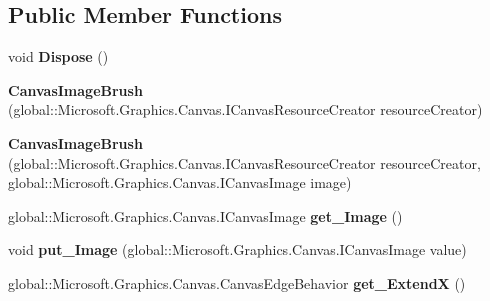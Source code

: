 \subsection*{Public Member Functions}
\begin{DoxyCompactItemize}
\item 
\mbox{\label{class_microsoft_1_1_graphics_1_1_canvas_1_1_brushes_1_1_canvas_image_brush_a287a8959ebff5767a97c27bfd52ec3b7}} 
void {\bfseries Dispose} ()
\item 
\mbox{\label{class_microsoft_1_1_graphics_1_1_canvas_1_1_brushes_1_1_canvas_image_brush_adbb56b8d19fbd4dfd899d515aba49f92}} 
{\bfseries Canvas\+Image\+Brush} (global\+::\+Microsoft.\+Graphics.\+Canvas.\+I\+Canvas\+Resource\+Creator resource\+Creator)
\item 
\mbox{\label{class_microsoft_1_1_graphics_1_1_canvas_1_1_brushes_1_1_canvas_image_brush_aeb29fd1437d8ae16d2fe8546010eb7db}} 
{\bfseries Canvas\+Image\+Brush} (global\+::\+Microsoft.\+Graphics.\+Canvas.\+I\+Canvas\+Resource\+Creator resource\+Creator, global\+::\+Microsoft.\+Graphics.\+Canvas.\+I\+Canvas\+Image image)
\item 
\mbox{\label{class_microsoft_1_1_graphics_1_1_canvas_1_1_brushes_1_1_canvas_image_brush_acd493d96591a7820f9e9bada709041ad}} 
global\+::\+Microsoft.\+Graphics.\+Canvas.\+I\+Canvas\+Image {\bfseries get\+\_\+\+Image} ()
\item 
\mbox{\label{class_microsoft_1_1_graphics_1_1_canvas_1_1_brushes_1_1_canvas_image_brush_af68d570f7be103d2a799285c816315c9}} 
void {\bfseries put\+\_\+\+Image} (global\+::\+Microsoft.\+Graphics.\+Canvas.\+I\+Canvas\+Image value)
\item 
\mbox{\label{class_microsoft_1_1_graphics_1_1_canvas_1_1_brushes_1_1_canvas_image_brush_ab8eedf6b67df8a2df6174d213c8ff556}} 
global\+::\+Microsoft.\+Graphics.\+Canvas.\+Canvas\+Edge\+Behavior {\bfseries get\+\_\+\+ExtendX} ()

\end{DoxyCompactItemize}
